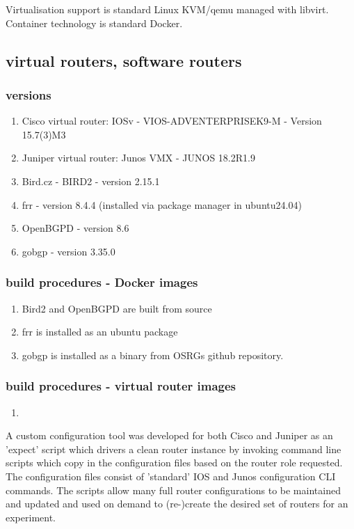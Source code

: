 Virtualisation support is standard Linux KVM/qemu managed with libvirt.
Container technology is standard Docker.

\subsection{virtual routers, software routers}
\subsubsection{versions}

\begin{enumerate}
\item Cisco virtual router: IOSv - VIOS-ADVENTERPRISEK9-M - Version 15.7(3)M3
\item Juniper virtual router: Junos VMX - JUNOS 18.2R1.9
\item Bird.cz - BIRD2 - version 2.15.1
\item frr - version 8.4.4 (installed via package manager in ubuntu24.04)
\item OpenBGPD - version 8.6
\item gobgp - version 3.35.0
\end{enumerate}

\subsubsection{build procedures - Docker images}

\begin{enumerate}
\item Bird2 and OpenBGPD are built from source
\item frr is installed as an ubuntu package
\item gobgp is installed as a binary from OSRGs github repository.
\end{enumerate}

\subsubsection{build procedures - virtual router images}

\begin{enumerate}
\item <reference source file directory>
\end{enumerate}

A custom configuration tool was developed for both Cisco and Juniper as an 'expect' script which drivers a clean router instance by invoking command line scripts which copy in the configuration files based on the router role requested.  The configuration files consist of 'standard' IOS and Junos configuration CLI commands.
The scripts allow many full router configurations to be maintained and updated and used on demand to (re-)create the desired set of routers for an experiment.

